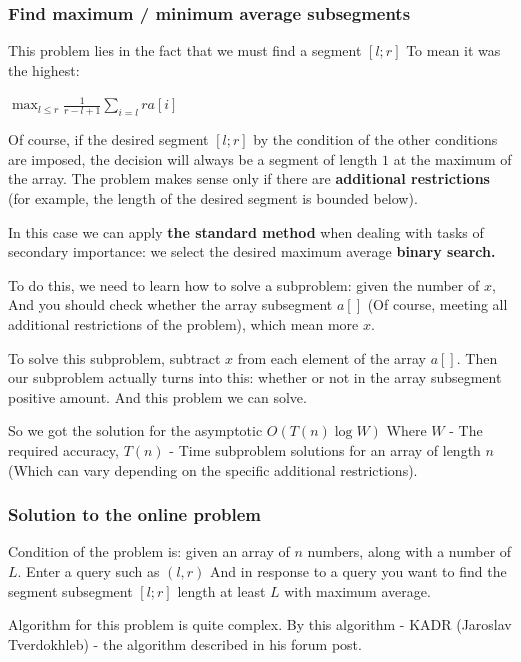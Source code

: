 \subsubsection{ Find maximum / minimum average subsegments }

This problem lies in the fact that we must find a segment $[l; r]$ To mean it was the highest:

$\max_{l\leq r}\frac{1}{r-l+1}\sum_{i=l}ra[i]$

Of course, if the desired segment $[l; r]$ by the condition of the other conditions are imposed, the decision will always be a segment of length $1$ at the maximum of the array. The problem makes sense only if there are \textbf{additional restrictions} (for example, the length of the desired segment is bounded below).

In this case we can apply \textbf{the standard method} when dealing with tasks of secondary importance: we select the desired maximum average \textbf{binary search.}

To do this, we need to learn how to solve a subproblem: given the number of $x$, And you should check whether the array subsegment $a []$ (Of course, meeting all additional restrictions of the problem), which mean more $x$.

To solve this subproblem, subtract $x$ from each element of the array $a []$. Then our subproblem actually turns into this: whether or not in the array subsegment positive amount. And this problem we can solve.

So we got the solution for the asymptotic $O (T (n) \log W)$ Where $W$ - The required accuracy, $T (n)$ - Time subproblem solutions for an array of length $n$ (Which can vary depending on the specific additional restrictions).

\subsubsection{ Solution to the online problem }

Condition of the problem is: given an array of $n$ numbers, along with a number of $L$. Enter a query such as $(l, r)$ And in response to a query you want to find the segment subsegment $[l; r]$ length at least $L$ with maximum average.

Algorithm for this problem is quite complex. By this algorithm - KADR (Jaroslav Tverdokhleb) - the algorithm described in his forum post.
